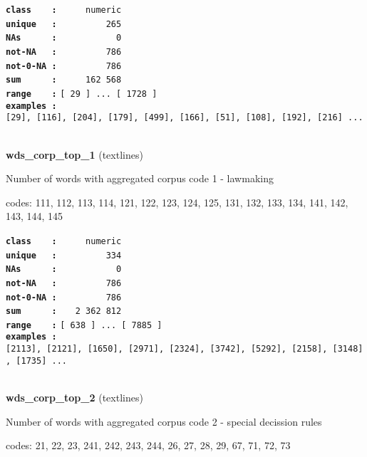 \documentclass[]{article}
\begin{document}
\textbf{\texttt{class\ \ \ \ :}} \texttt{~~~~~numeric}\\
\textbf{\texttt{unique\ \ \ :}} \texttt{~~~~~~~~~265}\\
\textbf{\texttt{NAs\ \ \ \ \ \ :}} \texttt{~~~~~~~~~~~0}\\
\textbf{\texttt{not-NA\ \ \ :}} \texttt{~~~~~~~~~786}\\
\textbf{\texttt{not-0-NA\ :}} \texttt{~~~~~~~~~786}\\
\textbf{\texttt{sum\ \ \ \ \ \ :}} \texttt{~~~~~162~568}\\
\textbf{\texttt{range\ \ \ \ :}}
\texttt{{[}\ 29\ {]}\ ...\ {[}\ 1728\ {]}}\\
\textbf{\texttt{examples\ :}}
\texttt{{[}29{]},\ {[}116{]},\ {[}204{]},\ {[}179{]},\ {[}499{]},\ {[}166{]},\ {[}51{]},\ {[}108{]},\ {[}192{]},\ {[}216{]}\ ...}\\

~

\textbf{wds\_corp\_top\_1} (textlines)

Number of words with aggregated corpus code 1 - lawmaking

codes: 111, 112, 113, 114, 121, 122, 123, 124, 125, 131, 132, 133, 134,
141, 142, 143, 144, 145

\textbf{\texttt{class\ \ \ \ :}} \texttt{~~~~~numeric}\\
\textbf{\texttt{unique\ \ \ :}} \texttt{~~~~~~~~~334}\\
\textbf{\texttt{NAs\ \ \ \ \ \ :}} \texttt{~~~~~~~~~~~0}\\
\textbf{\texttt{not-NA\ \ \ :}} \texttt{~~~~~~~~~786}\\
\textbf{\texttt{not-0-NA\ :}} \texttt{~~~~~~~~~786}\\
\textbf{\texttt{sum\ \ \ \ \ \ :}} \texttt{~~~2~362~812}\\
\textbf{\texttt{range\ \ \ \ :}}
\texttt{{[}\ 638\ {]}\ ...\ {[}\ 7885\ {]}}\\
\textbf{\texttt{examples\ :}}
\texttt{{[}2113{]},\ {[}2121{]},\ {[}1650{]},\ {[}2971{]},\ {[}2324{]},\ {[}3742{]},\ {[}5292{]},\ {[}2158{]},\ {[}3148{]},\ {[}1735{]}\ ...}\\

~

\textbf{wds\_corp\_top\_2} (textlines)

Number of words with aggregated corpus code 2 - special decission rules

codes: 21, 22, 23, 241, 242, 243, 244, 26, 27, 28, 29, 67, 71, 72, 73
\end{document}
